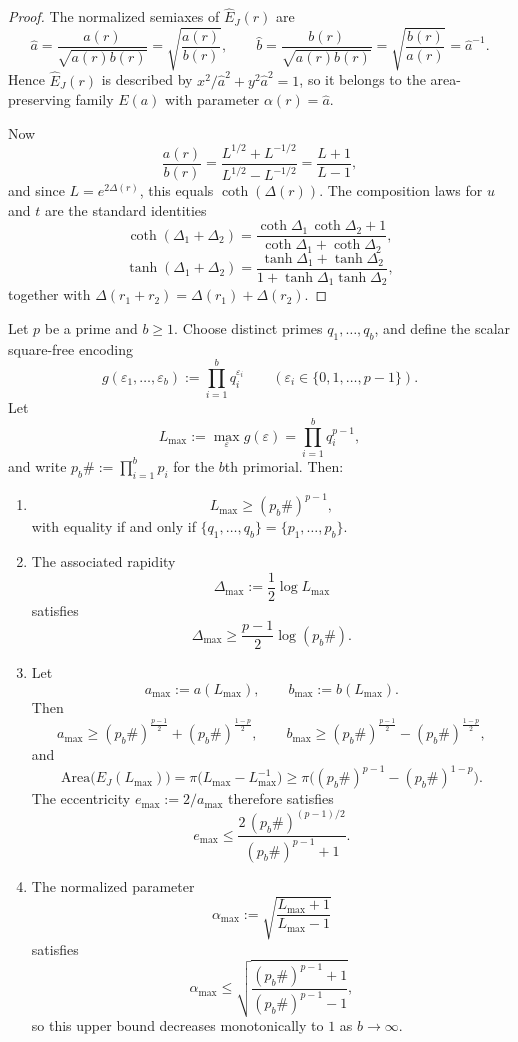 \begin{proof}
The normalized semiaxes of \(\widehat E_J(r)\) are
\[
\hat a=\frac{a(r)}{\sqrt{a(r)b(r)}}=\sqrt{\frac{a(r)}{b(r)}},
\qquad
\hat b=\frac{b(r)}{\sqrt{a(r)b(r)}}=\sqrt{\frac{b(r)}{a(r)}}=\hat a^{-1}.
\]
Hence \(\widehat E_J(r)\) is described by \(x^2/\hat a^2+y^2\hat a^2=1\), so it belongs to the area-preserving family \(E(a)\) with parameter \(\alpha(r)=\hat a\).

Now
\[
\frac{a(r)}{b(r)}
=\frac{L^{1/2}+L^{-1/2}}{L^{1/2}-L^{-1/2}}
=\frac{L+1}{L-1},
\]
and since \(L=e^{2\Delta(r)}\), this equals \(\coth(\Delta(r))\). The composition laws for \(u\) and \(t\) are the standard identities
\[
\coth(\Delta_1+\Delta_2)
=\frac{\coth\Delta_1\,\coth\Delta_2+1}{\coth\Delta_1+\coth\Delta_2},
\]
\[
\tanh(\Delta_1+\Delta_2)
=\frac{\tanh\Delta_1+\tanh\Delta_2}{1+\tanh\Delta_1\tanh\Delta_2},
\]
together with \(\Delta(r_1+r_2)=\Delta(r_1)+\Delta(r_2)\).
\end{proof}

\begin{proposition}\label{prop:primorial-ellipse-bound}
Let \(p\) be a prime and \(b\ge 1\). Choose distinct primes \(q_1,\dots,q_b\), and define the scalar square-free encoding
\[
g(\varepsilon_1,\dots,\varepsilon_b):=\prod_{i=1}^{b}q_i^{\varepsilon_i}
\qquad
(\varepsilon_i\in\{0,1,\dots,p-1\}).
\]
Let
\[
L_{\max}:=\max_{\varepsilon}g(\varepsilon)=\prod_{i=1}^{b}q_i^{p-1},
\]
and write \(p_b\#:=\prod_{i=1}^{b}p_i\) for the \(b\)th primorial. Then:
\begin{enumerate}
  \item
  \[
  L_{\max}\ge (p_b\#)^{p-1},
  \]
  with equality if and only if \(\{q_1,\dots,q_b\}=\{p_1,\dots,p_b\}\).

  \item The associated rapidity
  \[
  \Delta_{\max}:=\frac12\log L_{\max}
  \]
  satisfies
  \[
  \Delta_{\max}\ge \frac{p-1}{2}\log(p_b\#).
  \]

  \item Let
  \[
  a_{\max}:=a(L_{\max}),
  \qquad
  b_{\max}:=b(L_{\max}).
  \]
  Then
  \[
  a_{\max}\ge (p_b\#)^{\frac{p-1}{2}}+(p_b\#)^{\frac{1-p}{2}},
  \qquad
  b_{\max}\ge (p_b\#)^{\frac{p-1}{2}}-(p_b\#)^{\frac{1-p}{2}},
  \]
  and
  \[
  \mathrm{Area}\bigl(E_J(L_{\max})\bigr)
  =\pi\bigl(L_{\max}-L_{\max}^{-1}\bigr)
  \ge
  \pi\bigl((p_b\#)^{p-1}-(p_b\#)^{1-p}\bigr).
  \]
  The eccentricity \(e_{\max}:=2/a_{\max}\) therefore satisfies
  \[
  e_{\max}\le
  \frac{2\,(p_b\#)^{(p-1)/2}}{(p_b\#)^{p-1}+1}.
  \]

  \item The normalized parameter
  \[
  \alpha_{\max}:=\sqrt{\frac{L_{\max}+1}{L_{\max}-1}}
  \]
  satisfies
  \[
  \alpha_{\max}\le
  \sqrt{\frac{(p_b\#)^{p-1}+1}{(p_b\#)^{p-1}-1}},
  \]
  so this upper bound decreases monotonically to \(1\) as \(b\to\infty\).
\end{enumerate}
\end{proposition}

